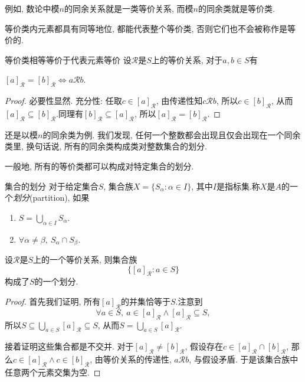 例如, 数论中模$n$的同余关系就是一类等价关系, 而模$n$的同余类就是等价类.

等价类内元素都具有同等地位, 都能代表整个等价类, 否则它们也不会被称作是等价的.

\begin{proposition}{等价类相等等价于代表元素等价}
	设$\mathcal{R}$是$S$上的等价关系, 对于$a, b \in S$有
	\begin{center}
		$[a]_{\mathcal{R}} = [b]_{\mathcal{R}} \Leftrightarrow a\mathcal{R} b.$
	\end{center}
\end{proposition}
\begin{proof}
	必要性显然. 充分性: 任取$c \in [a]_{\mathcal{R}}$, 由传递性知$c \mathcal{R} b$, 所以$c \in [b]_{\mathcal{R}}$, 从而$[a]_{\mathcal{R}} \subseteq [b]_{\mathcal{R}}$.同理有$[b]_{\mathcal{R}} \subseteq [a]_{\mathcal{R}}$, 所以$[a]_{\mathcal{R}} = [b]_{\mathcal{R}}$.
\end{proof}

还是以模$n$的同余类为例. 我们发现, 任何一个整数都会出现且仅会出现在一个同余类里, 换句话说, 所有的同余类构成类对整数集合的划分. 

一般地, 所有的等价类都可以构成对特定集合的划分. 

\begin{definition}{集合的划分}
	对于给定集合$S$, 集合族$X=\{ S_{\alpha} :  \alpha \in I \}$, 其中$I$是指标集.称$X$是$A$的一个\textit{划分}(partition), 如果
	\begin{enumerate}
		\item $S = \bigcup_{\alpha \in I} S_{\alpha}$.
		\item $\forall \alpha \neq \beta , ~S_{\alpha} \cap S_{\beta}$.
	\end{enumerate}
\end{definition}

\begin{theorem}
	设$\mathcal{R}$是$S$上的一个等价关系, 则集合族$$\{ [a]_{\mathcal{R}}: a \in S \}$$构成了$S$的一个划分.
\end{theorem}
\begin{proof}
	首先我们证明, 所有$[a]_{\mathcal{R}}$的并集恰等于$S$.注意到$$\forall a \in S, ~a \in [a]_{\mathcal{R}} \wedge [a]_{\mathcal{R}} \subseteq S, $$
	所以$S \subseteq \bigcup_{a \in S} [a]_{\mathcal{R}} \subseteq S$, 从而$S = \bigcup_{a \in S} [a]_{\mathcal{R}}$. 
	
	接着证明这些集合都是不交并. 对于$[a]_{\mathcal{R}} \neq [b]_{\mathcal{R}}$, 假设存在$c \in [a]_{\mathcal{R}} \cap [b]_{\mathcal{R}}$, 那么$c \in [a]_{\mathcal{R}} \wedge c \in [b]_{\mathcal{R}}$, 由等价关系的传递性, $a\mathcal{R}b$, 与假设矛盾. 于是该集合族中任意两个元素交集为空.
\end{proof}

